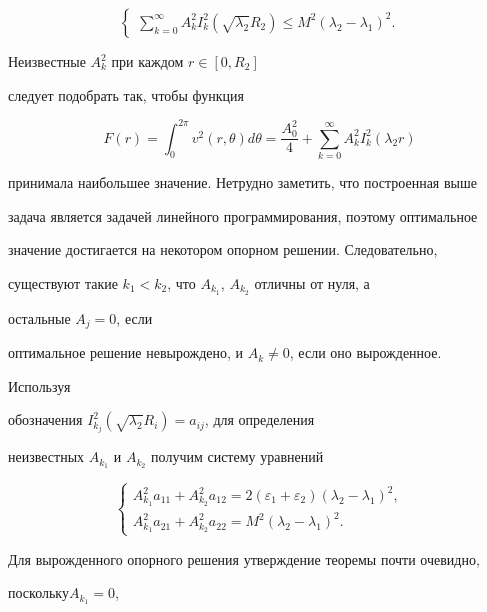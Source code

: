 \begin{pf}
\begin{equation}
\begin{cases}
\sum^\infty_{k=0}A^2_k I^2_k(\sqrt{\lambda_2}R_2)\le 


M^2(\lambda_2-\lambda_1)^2. 


\end{cases} 


\end{equation} 


Неизвестные $A^2_k$ при каждом $r\in[0,R_2]$ 


следует подобрать так, чтобы функция 


$$ 


F(r)=\int_0^{2\pi} v^2(r,\theta)d\theta= 


\frac{A^2_0}{4}+\sum^\infty_{k=0}A^2_k I^2_k(\lambda_2r) 


$$ 


принимала наибольшее значение. Нетрудно заметить, что построенная выше 


задача является задачей линейного программирования, поэтому оптимальное 


значение достигается на некотором опорном решении. Следовательно, 


существуют такие $k_1<k_2$, что $A_{k_1}$, $A_{k_2}$ отличны от нуля, а 


остальные $A_j=0$, если 


оптимальное решение невырождено, и $A_k\ne 0$, если оно вырожденное. 


Используя 


обозначения $I^2_{k_j}(\sqrt{\lambda_2}R_i)=a_{ij}$, для определения 


неизвестных $A_{k_1}$ и $A_{k_2}$ получим систему уравнений 


\begin{equation} 


\begin{cases} 


A^2_{k_1}a_{11}+A^2_{k_2}a_{12}=2(\varepsilon_1+\varepsilon_2) 


(\lambda_2-\lambda_1)^2,\\ 


A^2_{k_1}a_{21}+A^2_{k_2}a_{22}=M^2(\lambda_2-\lambda_1)^2. 


\end{cases} 


\end{equation} 


Для вырожденного опорного решения утверждение теоремы почти очевидно, 


поскольку\linebreak $A_{k_1}=0$, 



\end{pf}
